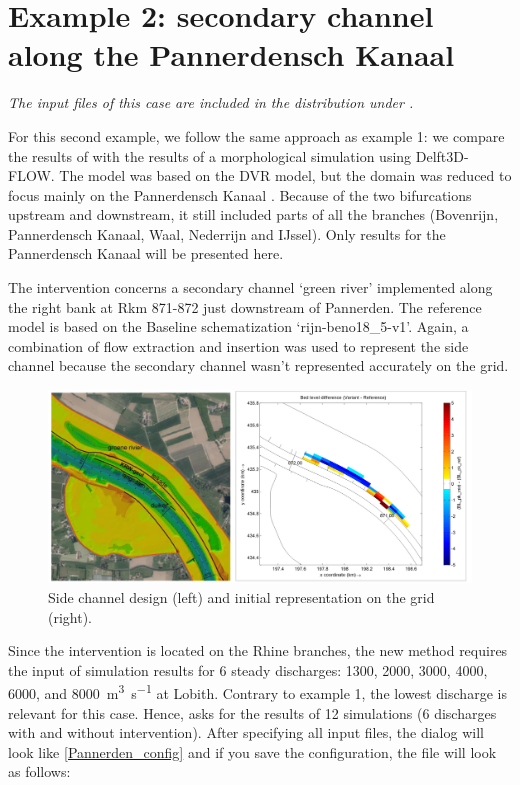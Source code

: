 \section{Example 2: secondary channel along the Pannerdensch Kanaal}

\emph{The input files of this case are included in the distribution under .}

For this second example, we follow the same approach as example 1: we compare the results of \dfastmi with the results of a morphological simulation using Delft3D-FLOW.
The model was based on the DVR model, but the domain was reduced to focus mainly on the Pannerdensch Kanaal \citep{BomLeeuwen2020}.
Because of the two bifurcations upstream and downstream, it still included parts of all the branches (Bovenrijn, Pannerdensch Kanaal, Waal, Nederrijn and IJssel).
Only results for the Pannerdensch Kanaal will be presented here.

The intervention concerns a secondary channel `green river' implemented along the right bank at Rkm 871-872 just downstream of Pannerden.
The reference model is based on the Baseline schematization ‘rijn-beno18\_5-v1’.
Again, a combination of flow extraction and insertion was used to represent the side channel because the secondary channel wasn't represented accurately on the grid.

\begin{figure}
\includegraphics[width=\columnwidth]{figures/Pannerden_proj.png}
\caption{Side channel design (left) and initial representation on the grid (right).}
\label{Pannerden_proj}
\end{figure}

Since the intervention is located on the Rhine branches, the new \dfastmi method requires the input of simulation results for 6 steady discharges: 1300, 2000, 3000, 4000, 6000, and \SI{8000}{\metre\cubed\per\second} at Lobith.
Contrary to example 1, the lowest discharge is relevant for this case.
Hence, \dfmi asks for the results of 12 simulations (6 discharges with and without intervention).
After specifying all input files, the dialog will look like \autoref{Pannerden_config} and if you save the configuration, the file will look as follows:

